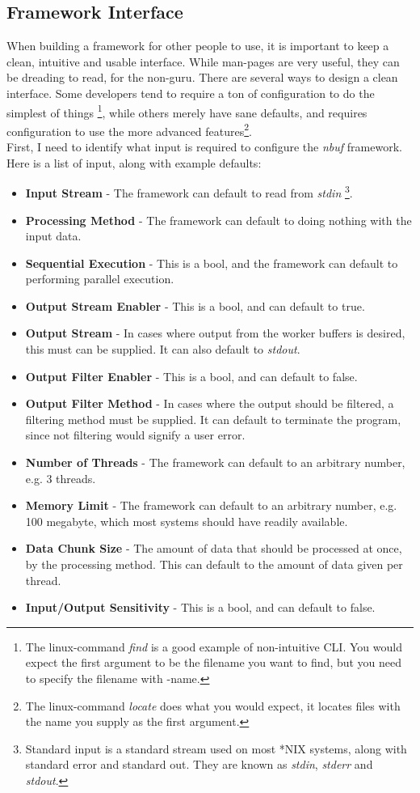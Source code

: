 \documentclass[a4paper]{article}
\newcommand{\nbuf}{\textit{nbuf} }
\begin{document}
\newpage
\subsection{Framework Interface}
When building a framework for other people to use, it is important to keep a clean, intuitive and usable interface. While man-pages are very useful, they can be dreading to read, for the non-guru. There are several ways to design a clean interface. Some developers tend to require a ton of configuration to do the simplest of things \footnote{The linux-command \textit{find} is a good example of non-intuitive CLI. You would expect the first argument to be the filename you want to find, but you need to specify the filename with -name.}, while others merely have sane defaults, and requires configuration to use the more advanced features\footnote{The linux-command \textit{locate} does what you would expect, it locates files with the name you supply as the first argument.}.\\

First, I need to identify what input is required to configure the \nbuf framework. Here is a list of input, along with example defaults:
\begin{itemize}
\item \textbf{Input Stream} - The framework can default to read from \textit{stdin} \footnote{Standard input is a standard stream used on most *NIX systems, along with standard error and standard out. They are known as \textit{stdin}, \textit{stderr} and \textit{stdout}.}.
\item \textbf{Processing Method} - The framework can default to doing nothing with the input data.
\item \textbf{Sequential Execution} - This is a bool, and the framework can default to performing parallel execution.
\item \textbf{Output Stream Enabler} - This is a bool, and can default to true.
\item \textbf{Output Stream} - In cases where output from the worker buffers is desired, this must can be supplied. It can also default to \textit{stdout}.
\item \textbf{Output Filter Enabler} - This is a bool, and can default to false.
\item \textbf{Output Filter Method} - In cases where the output should be filtered, a filtering method must be supplied. It can default to terminate the program, since not filtering would signify a user error.
\item \textbf{Number of Threads} - The framework can default to an arbitrary number, e.g. 3 threads.
\item \textbf{Memory Limit} - The framework can default to an arbitrary number, e.g. 100 megabyte, which most systems should have readily available.
\item \textbf{Data Chunk Size} - The amount of data that should be processed at once, by the processing method. This can default to the amount of data given per thread.
\item \textbf{Input/Output Sensitivity} - This is a bool, and can default to false.
\end{itemize}
\end{document}
